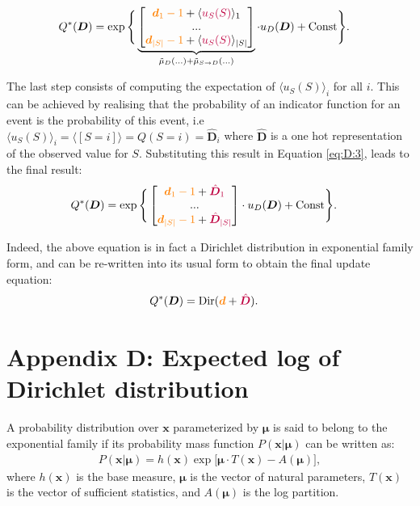 \documentclass[twoside,11pt]{article}
\begin{document}
\begin{align}\label{eq:D:3}
Q^*(\bm{D}) &= \exp \Bigg\{ \underbrace{\begin{bmatrix}
{\color{orange}\bm{d}_1 - 1} + \langle {\color{purple}u_{S}(S)} \rangle_1\\
...\\
{\color{orange}\bm{d}_{|S|} - 1} + \langle {\color{purple}u_{S}(S)} \rangle_{|S|}
\end{bmatrix}}_{\tilde{\mu}_{D}(...) + \tilde{\mu}_{S \rightarrow D}(...)}
\cdot u_{D}(\bm{D}) + \text{Const} \Bigg\}.
\end{align}

The last step consists of computing the expectation of $\langle u_{S}(S) \rangle_i$ for all $i$. This can be achieved by realising that the probability of an indicator function for an event is the probability of this event, i.e $\langle u_{S}(S) \rangle_i = \langle [S = i] \rangle = Q(S = i) = \hat{\bm{D}}_{i}$ where $\hat{\bm{D}}$ is a one hot representation of the observed value for $S$. Substituting this result in Equation \ref{eq:D:3}, leads to the final result:
\begin{align}
Q^*(\bm{D}) &= \exp \Bigg\{ \begin{bmatrix}
{\color{orange}\bm{d}_1 - 1} + {\color{purple}\hat{\bm{D}}_{1}}\\
...\\
{\color{orange}\bm{d}_{|S|} - 1} + {\color{purple}\hat{\bm{D}}_{|S|}}
\end{bmatrix}
\cdot u_{D}(\bm{D}) + \text{Const}\Bigg\}.
\end{align}

Indeed, the above equation is in fact a Dirichlet distribution in exponential family form, and can be re-written into its usual form to obtain the final update equation:
\begin{align}
Q^*(\bm{D}) &= \text{Dir}({\color{orange}\bm{d}} + {\color{purple}\hat{\bm{D}}}).
\end{align}

\section*{Appendix D: Expected log of Dirichlet distribution}

\begin{definition}
A probability distribution over $\bm{x}$ parameterized by $\bm{\mu}$ is said to belong to the exponential family if its probability mass function $P(\bm{x}|\bm{\mu})$ can be written as:
\begin{align}
P(\bm{x}|\bm{\mu}) = h(\bm{x}) \exp\Big[ \bm{\mu} \cdot T(\bm{x}) - A(\bm{\mu})\Big],
\end{align}
where $h(\bm{x})$ is the base measure, $\bm{\mu}$ is the vector of natural parameters, $T(\bm{x})$ is the vector of sufficient statistics, and $A(\bm{\mu})$ is the log partition.
\end{definition}
\end{document}
